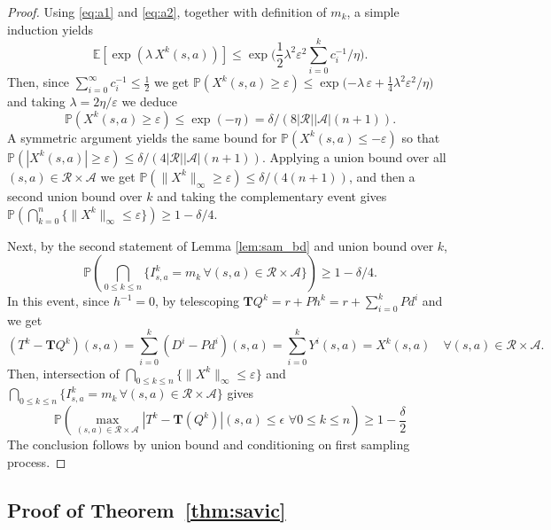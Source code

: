 \documentclass{article}
\theoremstyle{definition}
\theoremstyle{remark}
\newcommand{\expec}{\mathbb{E}}
\newcommand{\real}{\mathbb{R}}
\newcommand{\cA}{\mathcal{A}}
\newcommand{\cS}{\mathcal{S}}
\newcommand{\cP}{P}
\newcommand{\cR}{\mathcal{R}}
\newcommand{\T}{\mathbf{T}}
\newcommand{\prob}{\mathbb{P}}
\begin{document}
\begin{proof}
Using \eqref{eq:a1} and \eqref{eq:a2}, together with definition of $m_k$, 
a simple induction yields $$\expec[\exp(\lambda\,X^k(s,a))]\leq\exp\big(\mbox{$\frac{1}{2}\lambda^2\varepsilon^2\sum^k_{i=0} c^{-1}_i/\eta$}\big).$$ Then, since $\sum^{\infty}_{i=0}c^{-1}_i\leq\frac{1}{2}$ we get
$\prob(X^k(s,a)\geq\varepsilon)\leq \exp\big(\mbox{$-\lambda\,\varepsilon+\frac{1}{4}\lambda^2\varepsilon^2/\eta$}\big)$ and 
taking $\lambda=2\eta/\varepsilon$ we deduce
$$\prob(X^k(s,a)\geq\varepsilon)\leq \exp(-\eta)=\delta/(8|\cR||\cA|(n\!+\!1)).$$
A symmetric argument yields the same bound for $\prob(X^k(s,a)\leq-\varepsilon)$ so that 
$\prob(|X^k(s,a)|\geq\varepsilon)\leq \delta/(4|\cR||\cA|(n\!+\!1))$.
Applying a union bound over all $(s,a)\in\cR\times\cA$ we get $\prob(\|X^k\|_\infty\geq\varepsilon)\leq \delta/(4(n\!+\!1))$, and then a second union bound over $k$ and taking the complementary event gives $\prob(\bigcap_{k=0}^n\{\|X^k\|_\infty\leq\varepsilon\})\geq 1- \delta/4$.

Next, by the second statement of Lemma \ref{lem:sam_bd} and union bound over $k$,\[\prob\left(\bigcap_{0 \le k \le n} \{I^k_{s,a}=m_k \, \forall (s,a) \in \cR \times \cA\} \right)\geq 1- \delta/4.\]
 In this event, since $h^{-1}=0$, by telescoping $\T Q^k=r+\cP h^k=r+\sum_{i=0}^k\cP d^i$ and we get 
\[(T^k-\T Q^k)(s,a)=\sum_{i=0}^k(D^i-\cP d^i)(s,a)=\sum_{i=0}^kY^i(s,a)=X^k(s,a) \quad \forall (s,a)\in \cR\times \cA.\] Then, intersection of $\bigcap_{0 \le k \le n}\{\|X^k\|_\infty\leq\varepsilon\}$ and $\bigcap_{0 \le k \le n} \{I^k_{s,a}=m_k \, \forall(s,a) \in \cR \times \cA\}$ gives
 \[\prob\left(\max_{(s,a)\in \cR \times \cA} |T^k-\T(Q^k)|(s,a) \le  \epsilon \,\, \forall 0 \le k \le n \right) \ge 1-\frac{\delta}{2}\]
The conclusion follows by union bound and conditioning on first sampling process.
\end{proof}

\subsection{Proof of Theorem~\ref{thm:savic}}
\end{document}
